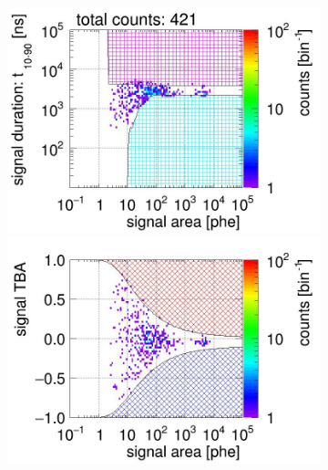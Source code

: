 \begin{landscape}
\begin{figure}[!p]
\begin{subfigure}[t]{0.32\textwidth}
			\caption{}
			\label{fig:signal selection dv 08 03}
		\end{subfigure}
		\begin{subfigure}[t]{0.32\textwidth}
			\centering
			\includegraphics[width=\figurewidth,clip,trim={0 98 0 15}]{Figures/GasTest/CutsValid/res64765/pdpa29Vecfig64765.jpg}
			\includegraphics[width=\figurewidth,clip,trim={0 98 0 40}]{Figures/GasTest/CutsValid/res64765/tbapa29Vecfig64765.jpg}

\end{subfigure}
\end{figure}
\end{landscape}

